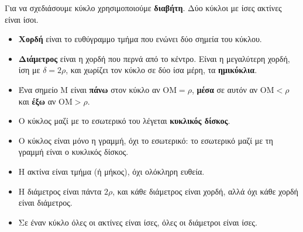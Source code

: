 Για να σχεδιάσουμε κύκλο χρησιμοποιούμε \textbf{διαβήτη}. Δύο κύκλοι με ίσες ακτίνες είναι ίσοι.

\begin{center}
\end{center}

\begin{itemize}[leftmargin=1.2em,itemsep=0.3ex,topsep=2pt]
\item \textbf{Χορδή} είναι το ευθύγραμμο τμήμα που ενώνει δύο σημεία του κύκλου.
\item \textbf{Διάμετρος} είναι η χορδή που περνά από το κέντρο. Είναι η μεγαλύτερη χορδή, ίση με $\delta=2\rho$, και χωρίζει τον κύκλο σε δύο ίσα μέρη, τα \textbf{ημικύκλια}.
\item Ένα σημείο $\mathrm{Μ}$ είναι \textbf{πάνω} στον κύκλο αν $\mathrm{ΟΜ}=\rho$, \textbf{μέσα} σε αυτόν αν $\mathrm{ΟΜ}<\rho$ και \textbf{έξω} αν $\mathrm{ΟΜ}>\rho$.
\item Ο κύκλος μαζί με το εσωτερικό του λέγεται \textbf{κυκλικός δίσκος}.
\end{itemize}

\begin{prosoxi}
\begin{itemize}[leftmargin=1.2em,itemsep=0.3ex,topsep=2pt]
\item Ο κύκλος είναι μόνο η γραμμή, όχι το εσωτερικό: το εσωτερικό μαζί με τη γραμμή είναι ο κυκλικός δίσκος.
\item Η ακτίνα είναι τμήμα (ή μήκος), όχι ολόκληρη ευθεία.
\item Η διάμετρος είναι πάντα $2\rho$, και κάθε διάμετρος είναι χορδή, αλλά όχι κάθε χορδή είναι διάμετρος.
\item Σε έναν κύκλο όλες οι ακτίνες είναι ίσες, όλες οι διάμετροι είναι ίσες.
\end{itemize}
\end{prosoxi}

